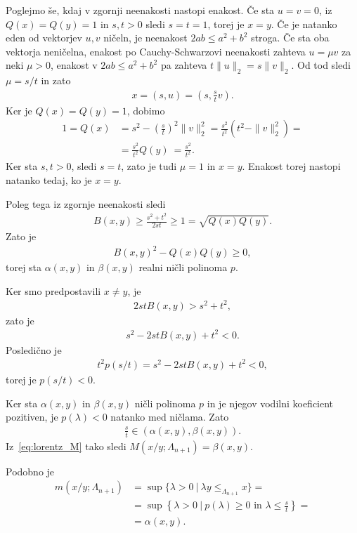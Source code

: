\documentclass[mat2, tisk]{fmfdelo}
\begin{document}
\begin{dokaz}
Poglejmo še, kdaj v zgornji neenakosti nastopi enakost.
Če sta $u=v=0$, iz $Q(x)=Q(y)=1$ in $s,t>0$
sledi $s=t=1$, torej je $x=y$.
Če je natanko eden od vektorjev $u,v$ ničeln,
je neenakost $2ab\leq a^2+b^2$ stroga.
Če sta oba vektorja neničelna, enakost po
Cauchy-Schwarzovi neenakosti zahteva
$u=\mu v$ za neki $\mu>0$,
enakost v $2ab\leq a^2+b^2$ pa zahteva
$t\|u\|_2=s\|v\|_2$.
Od tod sledi $\mu=s/t$ in zato
\begin{align*}
x
=
(s,u)
=
\left(s,\frac{s}{t}v\right).
\end{align*}
Ker je $Q(x)=Q(y)=1$, dobimo
\begin{align*}
1
=
Q(x)
&=
s^2-\left(\frac{s}{t}\right)^2\|v\|_2^2 =
\frac{s^2}{t^2}
\left(t^2-\|v\|_2^2\right) =\\
&=
\frac{s^2}{t^2}Q(y)\ =
\frac{s^2}{t^2}.
\end{align*}
Ker sta $s,t>0$, sledi $s=t$, zato je tudi $\mu=1$ in $x=y$.
Enakost torej nastopi natanko tedaj, ko je $x=y$.

Poleg tega iz zgornje neenakosti sledi
\begin{align*}
B(x,y)
\geq
\frac{s^2+t^2}{2st}
\geq
1
=
\sqrt{Q(x)Q(y)}.
\end{align*}
Zato je
\begin{align*}
B(x,y)^2-Q(x)Q(y)\geq0,
\end{align*}
torej sta $\alpha(x,y)$ in $\beta(x,y)$ realni ničli polinoma $p$.

Ker smo predpostavili $x\neq y$, je
\begin{align*}
2stB(x,y)>s^2+t^2,
\end{align*}
zato je
\begin{align*}
s^2-2stB(x,y)+t^2<0.
\end{align*}
Posledično je
\begin{align*}
t^2p(s/t)
=
s^2-2stB(x,y)+t^2
<0,
\end{align*}
torej je $p(s/t)<0$.

Ker sta $\alpha(x,y)$ in $\beta(x,y)$ ničli polinoma $p$ in je
njegov vodilni koeficient pozitiven, je $p(\lambda)<0$ natanko med
ničlama. Zato
\begin{align*}
\frac{s}{t}
\in
(\alpha(x,y),\beta(x,y)).
\end{align*}
Iz~\eqref{eq:lorentz_M} tako sledi
$M(x/y;\Lambda_{n+1})=\beta(x,y)$.

Podobno je
\begin{align*}
m(x/y;\Lambda_{n+1})
&=
\sup\limits
\{\lambda>0 ~|~
\lambda y\leq_{\Lambda_{n+1}}x\} =\\
&=
\sup\limits
\left\{
\lambda>0 ~|~
p(\lambda)\geq0
\text{ in }
\lambda\leq\frac{s}{t}
\right\}=\\
&=
\alpha(x,y).
\end{align*}
\end{dokaz}
\end{document}
